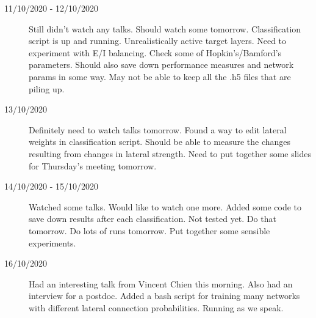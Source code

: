 \documentclass[a4paper,12pt]{article}
\theoremstyle{definition}
\begin{document}
\begin{description}
	\item[11/10/2020 - 12/10/2020] Still didn't watch any talks. Should watch some tomorrow. Classification script is up and running. Unrealistically active target layers. Need to experiment with E/I balancing. Check some of Hopkin's/Bamford's parameters. Should also save down performance measures and network params in some way. May not be able to keep all the .h5 files that are piling up.

	\item[13/10/2020] Definitely need to watch talks tomorrow. Found a way to edit lateral weights in classification script. Should be able to measure the changes resulting from changes in lateral strength. Need to put together some slides for Thursday's meeting tomorrow.

	\item[14/10/2020 - 15/10/2020] Watched some talks. Would like to watch one more. Added some code to save down results after each classification. Not tested yet. Do that tomorrow. Do lots of runs tomorrow. Put together some sensible experiments.

	\item[16/10/2020] Had an interesting talk from Vincent Chien this morning. Also had an interview for a postdoc. Added a bash script for training many networks with different lateral connection probabilities. Running as we speak. 

\end{description}
\end{document}
